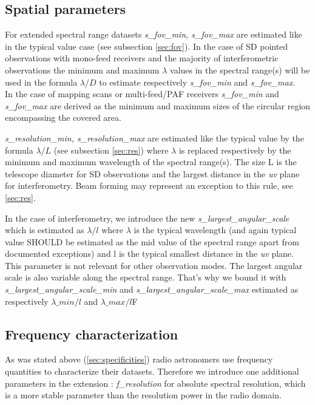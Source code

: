 \documentclass[11pt,a4paper]{ivoa}
\begin{document}
\subsection{Spatial parameters}

For extended spectral range datasets \emph{s\_fov\_min, s\_fov\_max} are estimated like in the typical value case (see subsection \ref{sec:fov}).  
In the case of SD pointed observations with mono-feed receivers and the majority of interferometric observations the minimum and maximum
$\lambda$ values in the spectral range(s) will be used in the formula  $\lambda / D$ to estimate respectively \emph{s\_fov\_min} and  \emph{s\_fov\_max}. \\
In the case of mapping scans or multi-feed/PAF receivers \emph{ s\_fov\_min} and \emph{s\_fov\_max} are derived as the minimum and maximum sizes of the 
circular region encompassing the covered area.

\emph{s\_resolution\_min, s\_resolution\_max} are estimated like the typical value by the formula  $\lambda / L$  (see subsection \ref{sec:res}) where $\lambda$ is replaced respectively by the minimum and maximum wavelength of the spectral range(s). The size L is the telescope diameter for SD observations and the largest distance in the \emph{uv} plane for interferometry. Beam forming may represent an exception to this rule, see \ref{sec:res}.

In the case of interferometry, we introduce the new \emph{s\_largest\_angular\_scale} which is estimated as $\lambda/l$ where $\lambda$ is the typical
wavelength (and again typical value SHOULD be estimated as the mid value of the spectral range apart from documented exceptions) and l is the typical smallest distance in the \emph{uv} plane. This parameter is not relevant for other observation modes.
The largest angular scale is also variable along the spectral range. That's why we bound it with \emph{s\_largest\_angular\_scale\_min} and \emph{s\_largest\_angular\_scale\_max} estimated as  respectively $\lambda\_min/l$ and  $\lambda\_max/l$F

\subsection{Frequency characterization}

As was stated above (\ref{sec:specificities}) radio astronomers use frequency quantities to characterize their datasets. Therefore we introduce one additional parameters in the extension : 
\emph{f\_resolution} for absolute spectral resolution, which is a more stable parameter than the resolution power in the radio domain.
\end{document}
